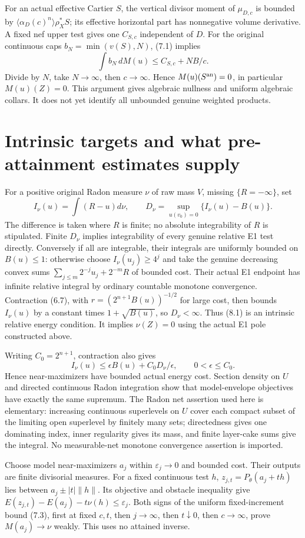 \documentclass[10pt]{article}
\begin{document}
For an actual effective Cartier $S$, the vertical divisor moment of
$\mu_{D,c}$ is bounded by
$\langle\alpha_D(c)^n\rangle\rho_X^*S$; its effective horizontal
part has nonnegative volume derivative. A fixed nef upper test gives
one $C_{S,c}$ independent of $D$. For the original continuous caps
$b_N=\min(v(S),N)$, (7.1) implies
\[
 \int b_N\,dM(u)\leq C_{S,c}+NB/c.
 \tag{7.6}
\]
Divide by $N$, take $N\to\infty$, then $c\to\infty$.
Hence $M(u)(S^{\rm an})=0$, in particular $M(u)(Z)=0$.
This argument gives algebraic nullness and uniform algebraic collars.
It does not yet identify all unbounded genuine weighted products.

\section{Intrinsic targets and what pre-attainment estimates supply}
For a positive original Radon measure $\nu$ of raw mass $V$, missing
$\{R=-\infty\}$, set
\[
 I_\nu(u)=\int(R-u)d\nu,\qquad
 D_\nu=\sup_{u(v_0)=0}\{I_\nu(u)-B(u)\}.
 \tag{8.1}
\]
The difference is taken where $R$ is finite; no absolute integrability
of $R$ is stipulated. Finite $D_\nu$ implies integrability of every
genuine relative E1 test directly. Conversely if all are integrable,
their integrals are uniformly bounded on $B(u)\leq1$: otherwise choose
$I_\nu(u_j)\geq4^j$ and take the genuine decreasing convex sums
$\sum_{j\leq m}2^{-j}u_j+2^{-m}R$ of bounded cost. Their actual E1
endpoint has infinite relative integral by ordinary countable monotone
convergence. Contraction (6.7), with $r=(2^{n+1}B(u))^{-1/2}$ for
large cost, then bounds $I_\nu(u)$ by a constant times $1+\sqrt{B(u)}$,
so $D_\nu<\infty$. Thus (8.1) is an intrinsic relative energy condition.
It implies $\nu(Z)=0$ using the actual E1 pole constructed above.

Writing $C_0=2^{n+1}$, contraction also gives
\[
 I_\nu(u)\leq\epsilon B(u)+C_0D_\nu/\epsilon,
 \qquad 0<\epsilon\leq C_0.
 \tag{8.2}
\]
Hence near-maximizers have bounded actual energy cost. Section density
on $U$ and directed continuous Radon integration show that model-envelope
objectives have exactly the same supremum. The Radon net assertion used
here is elementary: increasing continuous superlevels on $U$ cover each
compact subset of the limiting open superlevel by finitely many sets;
directedness gives one dominating index, inner regularity gives its mass,
and finite layer-cake sums give the integral. No measurable-net monotone
convergence assertion is imported.

Choose model near-maximizers $a_j$ within $\varepsilon_j\to0$ and bounded
cost. Their outputs are finite divisorial measures. For a fixed continuous
test $h$, $z_{j,t}=P_\theta(a_j+th)$ lies between
$a_j\pm|t|\|h\|$. Its objective and obstacle inequality give
$E(z_{j,t})-E(a_j)-t\nu(h)\leq\varepsilon_j$.
Both signs of the uniform fixed-increment bound (7.3), first at fixed
$c,t$, then $j\to\infty$, then $t\downarrow0$, then $c\to\infty$,
prove $M(a_j)\to\nu$ weakly. This uses no attained inverse.
\end{document}
